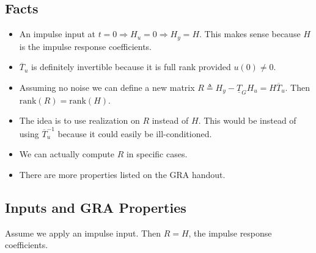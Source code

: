 \documentclass[lecture,12pt,]{pcms-l}
\begin{document}
\subsection{Facts}
\begin{itemize}
\item An impulse input at $t=0\Rightarrow H_u=0\Rightarrow H_y=H$. This makes sense because $H$ is the impulse response coefficients.
\item $\overline{T}_u$ is definitely invertible because it is full rank provided $u(0)\neq0$.
\item Assuming no noise we can define a new matrix $R\triangleq H_y-\underline{T}_GH_u = H\overline{T}_u$. Then $\text{rank}(R) = \text{rank}(H)$.
\item The idea is to use realization on $R$ instead of $H$. This would be instead of using $\overline{T}_u^{-1}$ because it could easily be ill-conditioned.
\item We can actually compute $R$ in specific cases.
\item There are more properties listed on the GRA handout.
\end{itemize}

\subsection{Inputs and GRA Properties}
Assume we apply an impulse input. Then $R=H$, the impulse response coefficients.
\end{document}

